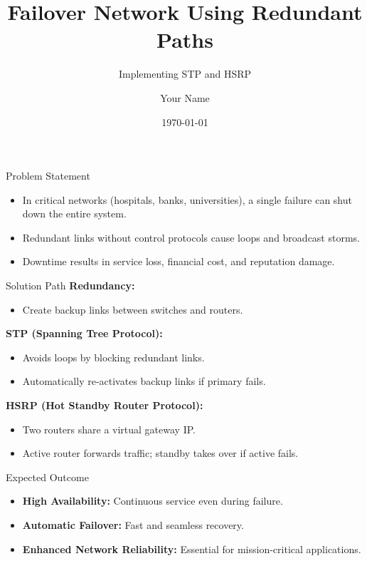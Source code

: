 \documentclass{beamer}
\title{\textbf{Failover Network Using Redundant Paths}}
\subtitle{Implementing STP and HSRP}
\author{Your Name}
\institute{Computer Network Conference}
\date{\today}
\begin{document}
\begin{frame}[plain]
\titlepage
\end{frame}

\usebackgroundtemplate{}

\begin{frame}{Problem Statement}
\Large
\begin{itemize}
    \item In critical networks (hospitals, banks, universities), a single failure can shut down the entire system.
    \item Redundant links without control protocols cause loops and broadcast storms.
    \item Downtime results in service loss, financial cost, and reputation damage.
\end{itemize}
\end{frame}

\begin{frame}{Solution Path}
\Large
\textbf{Redundancy:} 
\begin{itemize}
    \item Create backup links between switches and routers.
\end{itemize}
\vspace{0.5cm}
\textbf{STP (Spanning Tree Protocol):}
\begin{itemize}
    \item Avoids loops by blocking redundant links.
    \item Automatically re-activates backup links if primary fails.
\end{itemize}
\vspace{0.5cm}
\textbf{HSRP (Hot Standby Router Protocol):}
\begin{itemize}
    \item Two routers share a virtual gateway IP.
    \item Active router forwards traffic; standby takes over if active fails.
\end{itemize}
\end{frame}

\begin{frame}{Expected Outcome}
\Large
\begin{itemize}
    \item \textbf{High Availability:} Continuous service even during failure.
    \item \textbf{Automatic Failover:} Fast and seamless recovery.
    \item \textbf{Enhanced Network Reliability:} Essential for mission-critical applications.
\end{itemize}
\end{frame}
\end{document}
